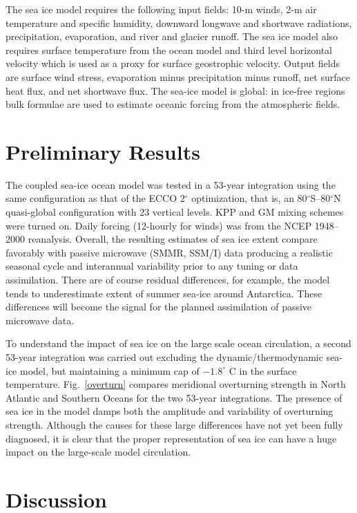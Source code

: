 The sea ice model requires the following input fields: 10-m winds, 2-m air
temperature and specific humidity, downward longwave and shortwave radiations,
precipitation, evaporation, and river and glacier runoff.  The sea ice model
also requires surface temperature from the ocean model and third level
horizontal velocity which is used as a proxy for surface geostrophic
velocity.  Output fields are surface wind stress, evaporation minus
precipitation minus runoff, net surface heat flux, and net shortwave flux.
The sea-ice model is global: in ice-free regions bulk formulae are used to
estimate oceanic forcing from the atmospheric fields.

\section{Preliminary Results}

The coupled sea-ice ocean model was tested in a 53-year integration using the
same configuration as that of the ECCO 2$^\circ$ optimization, that is, an
80$^\circ$S--80$^\circ$N quasi-global configuration with 23 vertical levels.
KPP and GM mixing schemes were turned on.  Daily forcing (12-hourly for winds)
was from the NCEP 1948--2000 reanalysis.  Overall, the resulting estimates of
sea ice extent compare favorably with passive microwave (SMMR, SSM/I) data
producing a realistic seasonal cycle and interannual variability prior to any
tuning or data assimilation.  There are of course residual differences, for
example, the model tends to underestimate extent of summer sea-ice around
Antarctica.  These differences will become the signal for the planned
assimilation of passive microwave data.

To understand the impact of sea ice on the large scale ocean circulation, a
second 53-year integration was carried out excluding the dynamic/thermodynamic
sea-ice model, but maintaining a minimum cap of $-1.8^\circ$ C in the surface
temperature.  Fig.~\ref{overturn} compares meridional overturning strength in
North Atlantic and Southern Oceans for the two 53-year integrations.  The
presence of sea ice in the model damps both the amplitude and variability of
overturning strength.  Although the causes for these large differences have
not yet been fully diagnosed, it is clear that the proper representation of
sea ice can have a huge impact on the large-scale model circulation.

\section{Discussion}

